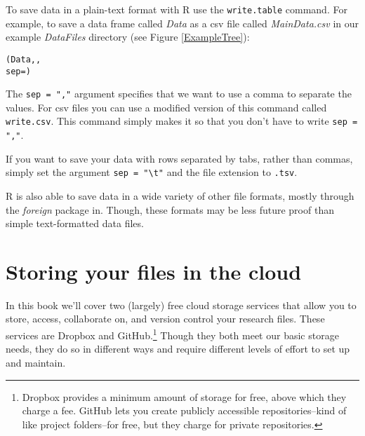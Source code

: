 To save data in a plain-text format with R use the \texttt{write.table} command. For example, to save a data frame called {\emph{Data}} as a csv file called {\emph{MainData.csv}} in our example {\emph{DataFiles}} directory (see Figure \ref{ExampleTree}):

\begin{knitrout}
\color{fgcolor}\begin{kframe}
\begin{alltt}
(Data, ,
                 sep = )
\end{alltt}
\end{kframe}
\end{knitrout}


\noindent The \texttt{sep = ","} argument specifies that we want to use a comma to separate the values. For csv files you can use a modified version of this command called \texttt{write.csv}. This command simply makes it so that you don't have to write \texttt{sep = ","}. 

If you want to save your data with rows separated by tabs, rather than commas, simply set the argument \texttt{sep = "\textbackslash{}t"} and the file extension to \texttt{.tsv}.\label{TSVEscape}

R is also able to save data in a wide variety of other file formats, mostly through the {\emph{foreign}} package in. Though, these formats may be less future proof than simple text-formatted data files.

\section{Storing your files in the cloud}

In this book we'll cover two (largely) free cloud storage services that allow you to store, access, collaborate on, and version control your research files. These services are Dropbox and GitHub.\footnote{Dropbox provides a minimum amount of storage for free, above which they charge a fee. GitHub lets you create publicly accessible repositories--kind of like project folders--for free, but they charge for private repositories.} Though they both meet our basic storage needs, they do so in different ways and require different levels of effort to set up and maintain.

